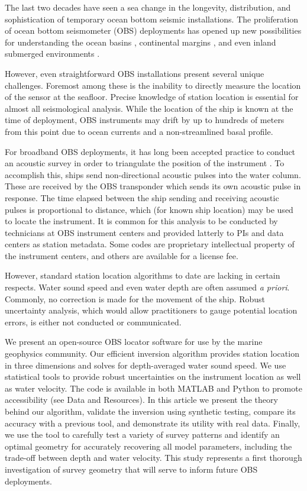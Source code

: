The last two decades have seen a sea change in the longevity, distribution, and sophistication of temporary ocean bottom seismic installations. The proliferation of ocean bottom seismometer (OBS) deployments has opened up new possibilities for understanding the ocean basins \citep[e.g.][]{Lin2016,Takeo2016}, continental margins \citep[e.g.][]{Janiszewski2015,Hawley2016,Lynner2017,Eilon2017}, and even inland submerged environments \citep[e.g.][]{Accardo2017}. 

However, even straightforward OBS installations present several unique challenges. Foremost among these is the inability to directly measure the location of the sensor at the seafloor. Precise knowledge of station location is essential for almost all seismological analysis. While the location of the ship is known at the time of deployment, OBS instruments may drift by up to hundreds of meters from this point due to ocean currents and a non-streamlined basal profile. 

For broadband OBS deployments, it has long been accepted practice to conduct an acoustic survey in order to triangulate the position of the instrument \citep[i.e.,][]{Creager1982}. To accomplish this, ships send non-directional acoustic pulses into the water column. These are received by the OBS transponder which sends its own acoustic pulse in response. The time elapsed between the ship sending and receiving acoustic pulses is proportional to distance, which (for known ship location) may be used to locate the instrument. It is common for this analysis to be conducted by technicians at OBS instrument centers and provided latterly to PIs and data centers as station metadata. Some codes are proprietary intellectual property of the instrument centers, and others are available for a license fee. 

However, standard station location algorithms to date are lacking in certain respects. Water sound speed and even water depth are often assumed \textit{a priori}. Commonly, no correction is made for the movement of the ship. Robust uncertainty analysis, which would allow practitioners to gauge potential location errors, is either not conducted or communicated. 

We present an open-source OBS locator software for use by the marine geophysics community. Our efficient inversion algorithm provides station location in three dimensions and solves for depth-averaged water sound speed. We use statistical tools to provide robust uncertainties on the instrument location as well as water velocity. The code is available in both MATLAB and Python to promote accessibility (see Data and Resources). In this article we present the theory behind our algorithm, validate the inversion using synthetic testing, compare its accuracy with a previous tool, and demonstrate its utility with real data. Finally, we use the tool to carefully test a variety of survey patterns and identify an optimal geometry for accurately recovering all model parameters, including the trade-off between depth and water velocity. This study represents a first thorough investigation of survey geometry that will serve to inform future OBS deployments.